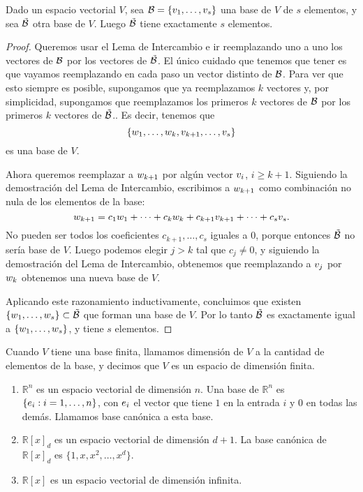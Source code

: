 \begin{proposicion}
Dado un espacio vectorial $V$, sea $\B = \{\vb_1, \dots, \vb_s\}$ una base de $V$ de $s$ elementos, y sea $\tilde{\mathcal B}$ otra base de $V$. Luego $\tilde{\mathcal B}$ tiene exactamente $s$ elementos.
\end{proposicion}
\begin{proof}
Queremos usar el Lema de Intercambio e ir reemplazando uno a uno los vectores de $\mathcal B$ por los vectores de $\tilde{\mathcal B}$. El \'unico cuidado que tenemos que tener es que vayamos reemplazando en cada paso un vector distinto de $\mathcal B$.
Para ver que esto siempre es posible, supongamos que ya reemplazamos $k$ vectores y, por simplicidad, supongamos que reemplazamos los primeros $k$ vectores de $\mathcal B$ por los primeros $k$ vectores de $\tilde{\mathcal B}$.. Es decir, tenemos que
$$
\{\wb_1, \dots, \wb_k, \vb_{k+1}, \dots, \vb_s\}
$$
es una base de $V$.

Ahora queremos reemplazar a $\wb_{k+1}$ por alg\'un vector $\vb_i$, $i \ge k+1$. Siguiendo la demostración del Lema de Intercambio, escribimos a $\wb_{k+1}$ como combinaci\'on no nula de los elementos de la base:
$$ \wb_{k+1} = c_1 \wb_1 + \dots + c_k \wb_k + c_{k+1} \vb_{k+1} + \dots + c_s \vb_s.$$
No pueden ser todos los coeficientes $c_{k+1}, \dots, c_s$ iguales a 0, porque entonces $\tilde{\mathcal B}$ no sería base de $V$. Luego podemos elegir $j > k$ tal que $c_j \neq 0$, y siguiendo la demostraci\'on del Lema de Intercambio, obtenemos que reemplazando a $\vb_j$ por $\wb_k$ obtenemos una nueva base de $V$.

Aplicando este razonamiento inductivamente, concluimos que existen $\{\wb_1, \dots, \wb_s\} \subset \tilde\B$ que forman una base de $V$. Por lo tanto $\tilde{\mathcal B}$ es exactamente igual a $\{\wb_1, \dots, \wb_s\}$, y tiene $s$ elementos.
\end{proof}

Cuando $V$ tiene una base finita, llamamos dimensión de $V$ a la cantidad de elementos de la base, y decimos que $V$ es un espacio de dimensión finita.

\begin{ejemplo}\leavevmode
\begin{enumerate}
\item $\mathbb{R}^n$ es un espacio vectorial de dimensión $n$. Una base de $\mathbb{R}^n$ es $\{\eb_i: i = 1, \dots, n\}$, con $\eb_i$ el vector que tiene $1$ en la entrada $i$ y $0$ en todas las demás. Llamamos base canónica a esta base.
\item $\mathbb{R}[x]_d$ es un espacio vectorial de dimensión $d+1$. La base canónica de $\mathbb{R}[x]_d$ es $\{1, x, x^2, \dots, x^d\}$.
\item $\mathbb{R}[x]$ es un espacio vectorial de dimensión infinita.
\end{enumerate}
\end{ejemplo}

